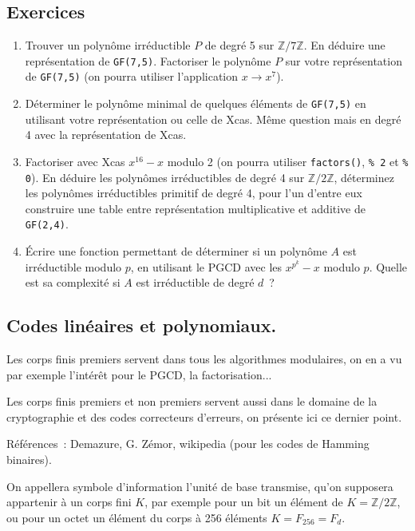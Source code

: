 \documentclass[a4paper,11pt]{article}
\newcommand{\Z}{{\mathbb{Z}}}
\begin{document}
\begin{giacjshere}
\subsection{Exercices}
\begin{enumerate}
\item Trouver un polyn\^ome irr\'eductible $P$ de degr\'e 5 sur $\Z/7\Z$.
En d\'eduire une repr\'esentation de \verb|GF(7,5)|. Factoriser 
le polyn\^ome $P$ sur votre repr\'esentation de \verb|GF(7,5)| (on pourra utiliser
l'application $x \rightarrow x^7$).
\item D\'eterminer le polyn\^ome minimal de quelques \'el\'ements
de \verb|GF(7,5)| en utilisant votre repr\'esentation ou celle de Xcas.
M\^eme question mais en degr\'e 4 avec la repr\'esentation de Xcas.
\item Factoriser avec Xcas $x^{16}-x$ modulo 2 (on pourra utiliser
\verb|factors()|, \verb|% 2| et \verb|% 0|). 
En d\'eduire les polyn\^omes irr\'eductibles de degr\'e 4 sur
  $\Z/2\Z$, d\'eterminez les polyn\^omes irr\'eductibles
primitif de degr\'e 4, pour l'un d'entre eux construire une table entre repr\'esentation
multiplicative et additive de \verb|GF(2,4)|.
\item \'Ecrire une fonction permettant de d\'eterminer si un
  polyn\^ome $A$ est irr\'eductible modulo $p$, en utilisant le
PGCD avec les $x^{p^k}-x$ modulo $p$. Quelle est sa complexit\'e
si $A$ est irr\'eductible de degr\'e $d$~?
\end{enumerate}




\subsection{Codes lin\'eaires et polynomiaux.}
 
Les corps finis premiers servent dans tous les algorithmes modulaires,
on en a vu par exemple l'int\'er\^et pour le PGCD, la factorisation...

Les corps finis premiers et non premiers servent aussi dans le
domaine de la cryptographie et des codes correcteurs d'erreurs, 
on pr\'esente ici ce dernier point.

R\'ef\'erences~: Demazure, G. Z\'emor, wikipedia (pour les codes de
Hamming binaires).
 
On appellera symbole d'information l'unit\'e de base transmise, qu'on
supposera appartenir à un corps fini $K$, par
exemple pour un bit un élément de $K=\Z/2\Z$, ou pour un octet 
un \'el\'ement du corps à 256 éléments $K=F_{256}=F_d$.


\end{giacjshere}
\end{document}
